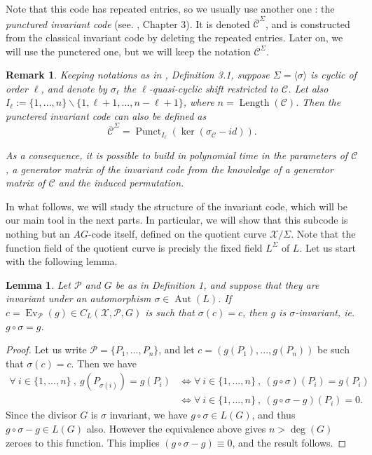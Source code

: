 \documentclass[10pt]{article}
\newtheorem{lem1}[thm]{Lemma}
\newtheorem{rq1}[thm]{Remark}
\newcommand{\s}{\vspace{0.3cm}}
\newcommand{\X}{\mathcal{X}}
\newcommand{\PR}{\mathcal{P}}
\newcommand{\Aut}{\operatorname{Aut}}
\begin{document}
Note that this code has repeated entries, so we usually use another one : the \emph{punctured invariant code} (see. \cite{Bar}, Chapter 3). It is denoted $\overline{\mathcal{C}}^{\Sigma}$, and is constructed from the classical invariant code by deleting the repeated entries. Later on, we will use the punctered one, but we will keep the notation $\mathcal{C}^{\Sigma}$. 

\s

\begin{rq1} \rm \label{gen inv}
Keeping notations as in \cite{Bar}, Definition 3.1, suppose $\Sigma = \langle \sigma \rangle$ is cyclic of order $\ell$, and denote by $\sigma_{\ell}$ the $\ell$-quasi-cyclic shift restricted to $\mathcal{C}$. Let also $I_{\ell} := \{1,...,n\}\backslash \{1,\ell+1,...,n-\ell+1\}$, where $n=\operatorname{Length}(\mathcal{C})$. Then the punctered invariant code can also be defined as
\[ \overline{\mathcal{C}}^{\Sigma} = \operatorname{Punct}_{ I_{\ell}}(\ker (\sigma_{\mathcal{C}}-id)).\]

\s

As a consequence, it is possible to build in polynomial time in the parameters of $\mathcal{C}$, a generator matrix of the invariant code from the knowledge of a generator matrix of $\mathcal{C}$ and the induced permutation. 
\end{rq1}


In what follows, we will study the structure of the invariant code, which will be our main tool in the next parts. In particular, we will show that this subcode is nothing but an $AG$-code itself, defined on the quotient curve $\X/\Sigma$. Note that the function field of the quotient curve is precisly the fixed field $L^{\Sigma}$ of $L$. Let us start with the following lemma.

\s

\begin{lem1} \label{inv}
Let $\PR$ and $G$ be as in Definition 1, and suppose that they are invariant under an automorphism $\sigma \in \Aut(L)$. If $c = \operatorname{Ev}_{\PR}(g) \in C_L(\X,\PR,G)$ is such that $\sigma(c) = c$, then $g$ is $\sigma$-invariant, ie. $g\circ \sigma = g$. 
\end{lem1}

\s

\begin{proof}
Let us write $\PR = \{P_1,...,P_n\}$, and let $c=(g(P_1),...,g(P_n))$ be such that $\sigma(c)=c$. Then we have 
\begin{align*}
\forall \ i \in \{1,...,n\} \ , \ g(P_{\sigma(i)}) = g(P_i) &\iff \forall \ i \in \{1,...,n\} \ , \ (g \circ \sigma)(P_i) =g(P_i) \\
& \iff \forall \ i \in \{1,...,n\} \ , \ (g\circ \sigma - g)(P_i) = 0.
\end{align*}
Since the divisor $G$ is $\sigma$ invariant, we have $g \circ \sigma \in L(G)$, and thus $g\circ \sigma - g \in L(G)$ also.
However the equivalence above gives $n>\deg(G)$ zeroes to this function. This implies $(g \circ \sigma - g) \equiv 0$, and the result follows.
\end{proof}
\end{document}
